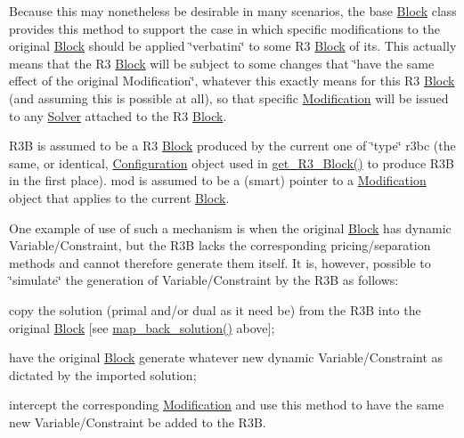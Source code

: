 Because this may nonetheless be desirable in many scenarios, the base \mbox{\hyperlink{class_s_m_spp__di__unipi__it_1_1_block}{Block}} class provides this method to support the case in which specific modifications to the original \mbox{\hyperlink{class_s_m_spp__di__unipi__it_1_1_block}{Block}} should be applied \char`\"{}verbatim\char`\"{} to some R3 \mbox{\hyperlink{class_s_m_spp__di__unipi__it_1_1_block}{Block}} of its. This actually means that the R3 \mbox{\hyperlink{class_s_m_spp__di__unipi__it_1_1_block}{Block}} will be subject to some changes that \char`\"{}have the same effect of the original Modification\char`\"{}, whatever this exactly means for this R3 \mbox{\hyperlink{class_s_m_spp__di__unipi__it_1_1_block}{Block}} (and assuming this is possible at all), so that specific \mbox{\hyperlink{class_s_m_spp__di__unipi__it_1_1_modification}{Modification}} will be issued to any \mbox{\hyperlink{class_s_m_spp__di__unipi__it_1_1_solver}{Solver}} attached to the R3 \mbox{\hyperlink{class_s_m_spp__di__unipi__it_1_1_block}{Block}}.

R3B is assumed to be a R3 \mbox{\hyperlink{class_s_m_spp__di__unipi__it_1_1_block}{Block}} produced by the current one of \char`\"{}type\char`\"{} r3bc (the same, or identical, \mbox{\hyperlink{class_s_m_spp__di__unipi__it_1_1_configuration}{Configuration}} object used in \mbox{\hyperlink{class_s_m_spp__di__unipi__it_1_1_block_a2e682f5c0d4a74503c0cb5ab38fb6428}{get\+\_\+\+R3\+\_\+\+Block()}} to produce R3B in the first place). mod is assumed to be a (smart) pointer to a \mbox{\hyperlink{class_s_m_spp__di__unipi__it_1_1_modification}{Modification}} object that applies to the current \mbox{\hyperlink{class_s_m_spp__di__unipi__it_1_1_block}{Block}}.

One example of use of such a mechanism is when the original \mbox{\hyperlink{class_s_m_spp__di__unipi__it_1_1_block}{Block}} has dynamic Variable/\+Constraint, but the R3B lacks the corresponding pricing/separation methods and cannot therefore generate them itself. It is, however, possible to \char`\"{}simulate\char`\"{} the generation of Variable/\+Constraint by the R3B as follows\+:


\begin{DoxyItemize}
\item copy the solution (primal and/or dual as it need be) from the R3B into the original \mbox{\hyperlink{class_s_m_spp__di__unipi__it_1_1_block}{Block}} \mbox{[}see \mbox{\hyperlink{class_s_m_spp__di__unipi__it_1_1_block_a04f0a8a608fcc3ded227c2552f67f1a3}{map\+\_\+back\+\_\+solution()}} above\mbox{]};
\item have the original \mbox{\hyperlink{class_s_m_spp__di__unipi__it_1_1_block}{Block}} generate whatever new dynamic Variable/\+Constraint as dictated by the imported solution;
\item intercept the corresponding \mbox{\hyperlink{class_s_m_spp__di__unipi__it_1_1_modification}{Modification}} and use this method to have the same new Variable/\+Constraint be added to the R3B.
\end{DoxyItemize}

